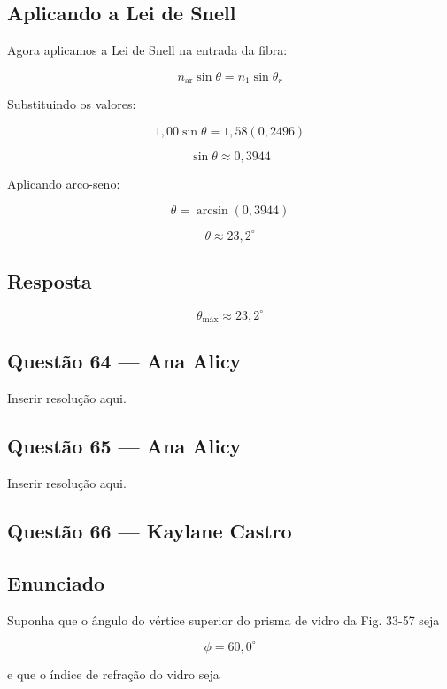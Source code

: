 \documentclass[12pt,a4paper]{article}
\begin{document}

\subsection*{Aplicando a Lei de Snell}

Agora aplicamos a Lei de Snell na entrada da fibra:

\[
n_{\text{ar}}\sin\theta =
n_1\sin\theta_r
\]

Substituindo os valores:

\[
1,00\sin\theta =
1,58(0,2496)
\]

\[
\sin\theta \approx 0,3944
\]

Aplicando arco-seno:

\[
\theta = \arcsin(0,3944)
\]

\[
\theta \approx 23,2^\circ
\]


\subsection*{Resposta}

\[
\boxed{
\theta_{\text{máx}} \approx 23,2^\circ
}
\]



\subsection{Questão 64 — Ana Alicy}
Inserir resolução aqui.

\subsection{Questão 65 — Ana Alicy}
Inserir resolução aqui.

\subsection{Questão 66 — Kaylane Castro}

\subsection*{Enunciado}

Suponha que o ângulo do vértice superior do prisma de vidro da Fig. 33-57 seja

\[
\phi = 60,0^\circ
\]

e que o índice de refração do vidro seja
\end{document}
